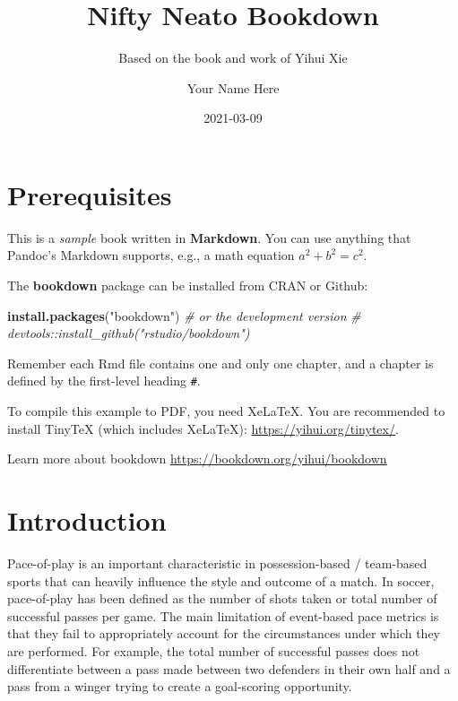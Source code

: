 \documentclass[]{book}
\title{Nifty Neato Bookdown}
\subtitle{Based on the book and work of Yihui Xie}
\author{Your Name Here}
\date{2021-03-09}
\newenvironment{Shaded}{\begin{snugshade}}{\end{snugshade}}
\newcommand{\CommentTok}[1]{\textcolor[rgb]{0.56,0.35,0.01}{\textit{#1}}}
\newcommand{\KeywordTok}[1]{\textcolor[rgb]{0.13,0.29,0.53}{\textbf{#1}}}
\newcommand{\NormalTok}[1]{#1}
\newcommand{\StringTok}[1]{\textcolor[rgb]{0.31,0.60,0.02}{#1}}
\begin{document}
\maketitle

{
\setcounter{tocdepth}{1}
\tableofcontents
}
\hypertarget{prerequisites}{%
\chapter{Prerequisites}\label{prerequisites}}

This is a \emph{sample} book written in \textbf{Markdown}. You can use anything that Pandoc's Markdown supports, e.g., a math equation \(a^2 + b^2 = c^2\).

The \textbf{bookdown} package can be installed from CRAN or Github:

\begin{Shaded}
\begin{Highlighting}[]
\KeywordTok{install.packages}\NormalTok{(}\StringTok{"bookdown"}\NormalTok{)}
\CommentTok{# or the development version}
\CommentTok{# devtools::install_github("rstudio/bookdown")}
\end{Highlighting}
\end{Shaded}

Remember each Rmd file contains one and only one chapter, and a chapter is defined by the first-level heading \texttt{\#}.

To compile this example to PDF, you need XeLaTeX. You are recommended to install TinyTeX (which includes XeLaTeX): \url{https://yihui.org/tinytex/}.

Learn more about bookdown \url{https://bookdown.org/yihui/bookdown}

\hypertarget{intro}{%
\chapter{Introduction}\label{intro}}

Pace-of-play is an important characteristic in possession-based / team-based sports that can heavily influence the style and outcome of a match. In soccer, pace-of-play has been defined as the number of shots taken or total number of successful passes per game. The main limitation of event-based pace metrics is that they fail to appropriately account for the circumstances under which they are performed. For example, the total number of successful passes does not differentiate between a pass made between two defenders in their own half and a pass from a winger trying to create a goal-scoring opportunity.
\end{document}

